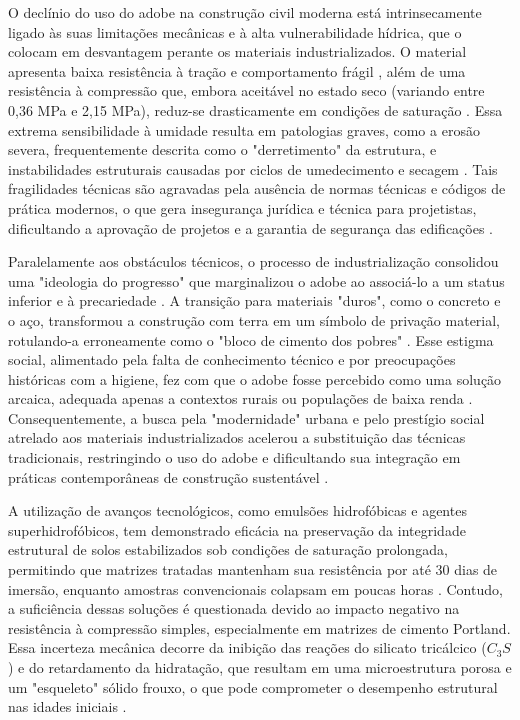 O declínio do uso do adobe na construção civil moderna está intrinsecamente ligado às suas limitações mecânicas e à alta vulnerabilidade hídrica, que o colocam em desvantagem perante os materiais industrializados. O material apresenta baixa resistência à tração e comportamento frágil \cite{Brito2023, Fages2022}, além de uma resistência à compressão que, embora aceitável no estado seco (variando entre 0,36 MPa e 2,15 MPa), reduz-se drasticamente em condições de saturação \cite{Kafodya2019, Khunaprapakorn2025, Dao2018}. Essa extrema sensibilidade à umidade resulta em patologias graves, como a erosão severa, frequentemente descrita como o "derretimento" da estrutura, e instabilidades estruturais causadas por ciclos de umedecimento e secagem \cite{Day1993, Sharma2016}. Tais fragilidades técnicas são agravadas pela ausência de normas técnicas e códigos de prática modernos, o que gera insegurança jurídica e técnica para projetistas, dificultando a aprovação de projetos e a garantia de segurança das edificações \cite{Fages2022, Martins2018, Morel2021, Victor2025}.

Paralelamente aos obstáculos técnicos, o processo de industrialização consolidou uma "ideologia do progresso" que marginalizou o adobe ao associá-lo a um status inferior e à precariedade \cite{Aspillaga2024, Morel2021, Novato2019}. A transição para materiais "duros", como o concreto e o aço, transformou a construção com terra em um símbolo de privação material, rotulando-a erroneamente como o "bloco de cimento dos pobres" \cite{Zoungrana2021}. Esse estigma social, alimentado pela falta de conhecimento técnico e por preocupações históricas com a higiene, fez com que o adobe fosse percebido como uma solução arcaica, adequada apenas a contextos rurais ou populações de baixa renda \cite{Soler2021, Novato2019, Morel2021, Aspillaga2024}. Consequentemente, a busca pela "modernidade" urbana e pelo prestígio social atrelado aos materiais industrializados acelerou a substituição das técnicas tradicionais, restringindo o uso do adobe e dificultando sua integração em práticas contemporâneas de construção sustentável \cite{Zoungrana2021}.


A utilização de avanços tecnológicos, como emulsões hidrofóbicas e agentes superhidrofóbicos, tem demonstrado eficácia na preservação da integridade estrutural de solos estabilizados sob condições de saturação prolongada, permitindo que matrizes tratadas mantenham sua resistência por até 30 dias de imersão, enquanto amostras convencionais colapsam em poucas horas \cite{Guo2025}. Contudo, a suficiência dessas soluções é questionada devido ao impacto negativo na resistência à compressão simples, especialmente em matrizes de cimento Portland. Essa incerteza mecânica decorre da inibição das reações do silicato tricálcico ($C_3S$) e do retardamento da hidratação, que resultam em uma microestrutura porosa e um "esqueleto" sólido frouxo, o que pode comprometer o desempenho estrutural nas idades iniciais \cite{Lu2023, Luo2023, Jahandari2023}.

